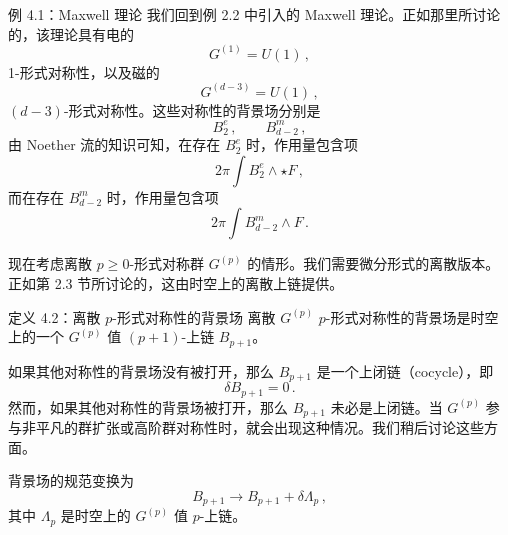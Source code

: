 \begin{examplebox}{例 4.1：Maxwell 理论}
我们回到例 2.2 中引入的 Maxwell 理论。正如那里所讨论的，该理论具有电的
\begin{equation}
  G^{(1)}=U(1)\,, \tag{4.11}
\end{equation}
1-形式对称性，以及磁的
\begin{equation}
  G^{(d-3)}=U(1)\,, \tag{4.12}
\end{equation}
$(d-3)$-形式对称性。这些对称性的背景场分别是
\begin{equation}
  B^e_2\,,\qquad B^m_{d-2}\,, \tag{4.13}
\end{equation}
由 Noether 流的知识可知，在存在 $B^e_2$ 时，作用量包含项
\begin{equation}
  2\pi\int B^e_2\wedge\star F\,, \tag{4.14}
\end{equation}
而在存在 $B^m_{d-2}$ 时，作用量包含项
\begin{equation}
  2\pi\int B^m_{d-2}\wedge F\,. \tag{4.15}
\end{equation}
\end{examplebox}


 现在考虑离散 $p\ge0$-形式对称群 $G^{(p)}$ 的情形。我们需要微分形式的离散版本。正如第 2.3 节所讨论的，这由时空上的离散上链提供。

\begin{definitionbox}{定义 4.2：离散 $p$-形式对称性的背景场}
离散 $G^{(p)}$ $p$-形式对称性的背景场是时空上的一个 $G^{(p)}$ 值 $(p+1)$-上链 $B_{p+1}$。
\end{definitionbox}

如果其他对称性的背景场没有被打开，那么 $B_{p+1}$ 是一个上闭链（cocycle），即
\begin{equation}
  \delta B_{p+1}=0\,. \tag{4.16}
\end{equation}
然而，如果其他对称性的背景场被打开，那么 $B_{p+1}$ 未必是上闭链。当 $G^{(p)}$ 参与非平凡的群扩张或高阶群对称性时，就会出现这种情况。我们稍后讨论这些方面。

背景场的规范变换为
\begin{equation}
  B_{p+1}\to B_{p+1}+\delta\Lambda_p\,, \tag{4.17}
\end{equation}
其中 $\Lambda_p$ 是时空上的 $G^{(p)}$ 值 $p$-上链。

